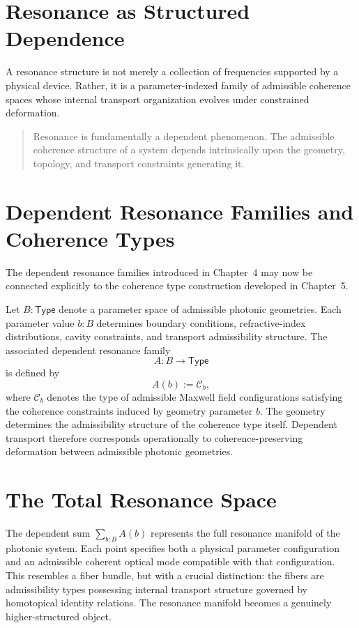 \documentclass[11pt,openany]{book}
\theoremstyle{definition}
\theoremstyle{plain}
\newcommand{\Type}{\mathsf{Type}}
\begin{document}
\bigskip

\section{Resonance as Structured Dependence}

A resonance structure is not merely a collection of frequencies supported by a physical device. Rather, it is a parameter-indexed family of admissible coherence spaces whose internal transport organization evolves under constrained deformation.

\begin{quote}
Resonance is fundamentally a dependent phenomenon. The admissible coherence structure of a system depends intrinsically upon the geometry, topology, and transport constraints generating it.
\end{quote}

\section{Dependent Resonance Families and Coherence Types}

The dependent resonance families introduced in Chapter~4 may now be connected explicitly to the coherence type construction developed in Chapter~5.

Let $B : \Type$ denote a parameter space of admissible photonic geometries. Each parameter value $b : B$ determines boundary conditions, refractive-index distributions, cavity constraints, and transport admissibility structure. The associated dependent resonance family
\[
A : B \to \Type
\]
is defined by
\[
A(b) := \mathcal{C}_b,
\]
where $\mathcal{C}_b$ denotes the type of admissible Maxwell field configurations satisfying the coherence constraints induced by geometry parameter $b$. The geometry determines the admissibility structure of the coherence type itself. Dependent transport therefore corresponds operationally to coherence-preserving deformation between admissible photonic geometries.

\section{The Total Resonance Space}

The dependent sum $\sum_{b:B} A(b)$ represents the full resonance manifold of the photonic system. Each point specifies both a physical parameter configuration and an admissible coherent optical mode compatible with that configuration. This resembles a fiber bundle, but with a crucial distinction: the fibers are admissibility types possessing internal transport structure governed by homotopical identity relations. The resonance manifold becomes a genuinely higher-structured object.
\end{document}
